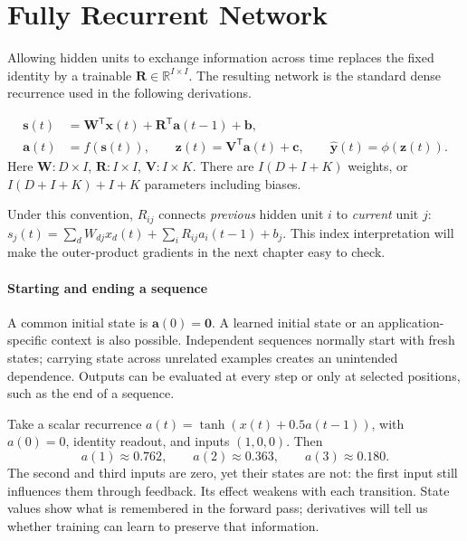 \documentclass[11pt, oneside]{book}
\newcommand{\R}{\mathbb{R}}
\newcommand{\T}{^{\mathsf{T}}}           %
\let\originalsection\section
\renewcommand{\section}{\Needspace{7\baselineskip}\originalsection}
\begin{document}
\section{Fully Recurrent Network}\label{sec:source-1-3}
Allowing hidden units to exchange information across time replaces the fixed identity by a trainable $\mathbf{R}\in\R^{I\times I}$. The resulting network is the standard dense recurrence used in the following derivations.

\begin{thmbox}[title={Forward equations and parameter shapes}]
\begin{align}
 \mathbf{s}(t)&=\mathbf{W}\T\mathbf{x}(t)+\mathbf{R}\T\mathbf{a}(t-1)+\mathbf{b},\label{eq:rnn-state}\\
 \mathbf{a}(t)&=f(\mathbf{s}(t)),\qquad
 \mathbf{z}(t)=\mathbf{V}\T\mathbf{a}(t)+\mathbf{c},\qquad
 \widehat{\mathbf{y}}(t)=\phi(\mathbf{z}(t)).\label{eq:rnn-readout}
\end{align}
Here $\mathbf{W}:D\times I$, $\mathbf{R}:I\times I$, $\mathbf{V}:I\times K$. There are $I(D+I+K)$ weights, or $I(D+I+K)+I+K$ parameters including biases.
\end{thmbox}

Under this convention, $R_{ij}$ connects \emph{previous} hidden unit $i$ to \emph{current} unit $j$: $s_j(t)=\sum_d W_{dj}x_d(t)+\sum_i R_{ij}a_i(t-1)+b_j$. This index interpretation will make the outer-product gradients in the next chapter easy to check.

\paragraph{Starting and ending a sequence} A common initial state is $\mathbf{a}(0)=\mathbf{0}$. A learned initial state or an application-specific context is also possible. Independent sequences normally start with fresh states; carrying state across unrelated examples creates an unintended dependence. Outputs can be evaluated at every step or only at selected positions, such as the end of a sequence.

\begin{exbox}[title={A memory trace in three steps}]
Take a scalar recurrence $a(t)=\tanh(x(t)+0.5a(t-1))$, with $a(0)=0$, identity readout, and inputs $(1,0,0)$. Then
\[
 a(1)\approx0.762,\qquad a(2)\approx0.363,\qquad a(3)\approx0.180.
\]
The second and third inputs are zero, yet their states are not: the first input still influences them through feedback. Its effect weakens with each transition. State values show what is remembered in the forward pass; derivatives will tell us whether training can learn to preserve that information.
\end{exbox}
\end{document}
